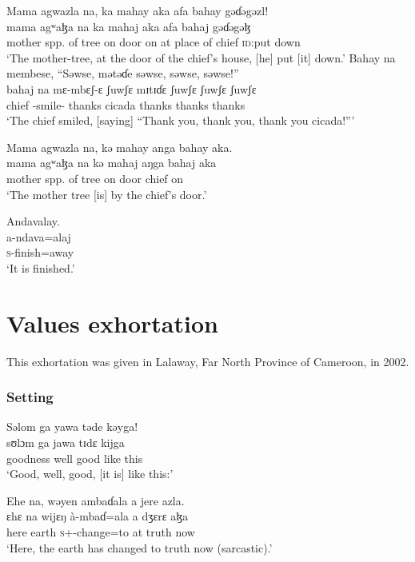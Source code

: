 \ea Mama  agwazla  na,  ka  mahay  aka  afa  bahay  gəɗəgəzl!         \\
 \gll mama  agʷaɮa     na  ka   mahaj   aka   afa       bahaj  gəɗəgəɮ \\
 mother  {spp. of tree}   {\PSP}  on     door        on      {at place of}     chief   {\textsc{id}:put down}\\
 \glt ‘The mother-tree,  at the door of the chief’s house, [he] put [it] down.’  
 \z
\ea  Bahay  na  membese,  “Səwse,   mətəɗe   səwse, səwse, səwse!”\\
 \gll bahaj      na  mɛ-mbɛʃ-ɛ  ʃuwʃɛ   mɪtɪɗɛ   ʃuwʃɛ  ʃuwʃɛ  ʃuwʃɛ\\
 chief  {\PSP}  {\NOM}-smile{}-{\CL}  thanks   cicada   thanks   thanks    thanks\\
 \glt ‘The chief smiled, [saying] “Thank you, thank you, thank you cicada!”’
 \z
 
\ea  Mama  agwazla  na,  kə  mahay  anga  bahay  aka.\\
 \gll mama  agʷaɮa   na  kə  mahaj  aŋga  bahaj  aka\\
 mother  {spp. of tree}       {\PSP}  on     door  {\POSS}  chief  on\\
 \glt ‘The mother tree [is] by the chief's door.’
 \z

\ea  Andavalay.\\
 \gll a-ndava=alaj\\ 
 \textsc{s}-finish=away\\
 \glt ‘It is finished.’
\z

\clearpage
 \section[Values exhortation]{Values exhortation }\setcounter{equation}{0}\label{sec:1.7}
 \hypertarget{RefHeading1210381525720847}{}
 This exhortation was given in Lalaway, Far North Province of Cameroon, in 2002.  
 
 \subsubsection*{Setting}
\ea Səlom  ga  yawa  təde  kəyga!\\
 \gll sʊlɔm  ga  jawa   tɪdɛ   kijga\\
 goodness  {\ADJ}  well  good  {like this}\\
 \glt ‘Good, well, good, [it is] like this:’
 \z

\ea Ehe  na,  wəyen  ambaɗala  a  jere  azla.\\
 \gll ɛhɛ     na wijɛŋ   à-mbaɗ=ala   a   dʒɛrɛ   aɮa\\
 here    {\PSP}  earth  \textsc{s}+{\PFV}-change=to  at  truth  now\\
 \glt ‘Here, the earth has changed to truth now (sarcastic).’
 \z

